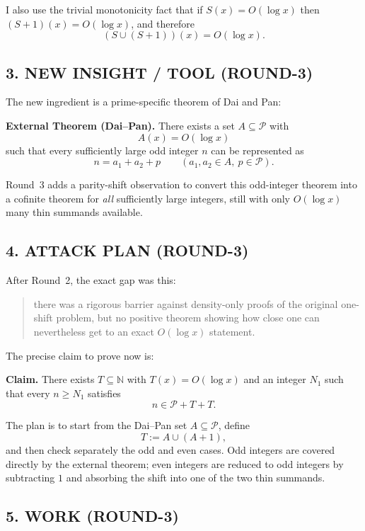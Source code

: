 I also use the trivial monotonicity fact that if $S(x)=O(\log x)$ then $(S+1)(x)=O(\log x)$, and therefore
\[
(S\cup(S+1))(x)=O(\log x).
\]

\subsection{3. NEW INSIGHT / TOOL (ROUND-3)}

The new ingredient is a prime-specific theorem of Dai and Pan:

\medskip
\noindent
\textbf{External Theorem (Dai--Pan).}
There exists a set $A\subseteq \mathcal P$ with
\[
A(x)=O(\log x)
\]
such that every sufficiently large odd integer $n$ can be represented as
\[
 n=a_1+a_2+p
 \qquad (a_1,a_2\in A,\ p\in\mathcal P).
\]
\medskip

Round~3 adds a parity-shift observation to convert this odd-integer theorem into a cofinite theorem for \emph{all} sufficiently large integers, still with only $O(\log x)$ many thin summands available.

\subsection{4. ATTACK PLAN (ROUND-3)}

After Round~2, the exact gap was this:

\begin{quote}
there was a rigorous barrier against density-only proofs of the original one-shift problem, but no positive theorem showing how close one can nevertheless get to an exact $O(\log x)$ statement.
\end{quote}

The precise claim to prove now is:

\medskip
\noindent
\textbf{Claim.}
There exists $T\subseteq\mathbb N$ with $T(x)=O(\log x)$ and an integer $N_1$ such that every $n\ge N_1$ satisfies
\[
 n\in \mathcal P+T+T.
\]
\medskip

The plan is to start from the Dai--Pan set $A\subseteq\mathcal P$, define
\[
T:=A\cup (A+1),
\]
and then check separately the odd and even cases.  Odd integers are covered directly by the external theorem; even integers are reduced to odd integers by subtracting $1$ and absorbing the shift into one of the two thin summands.

\subsection{5. WORK (ROUND-3)}

